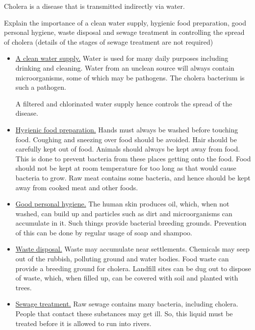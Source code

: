 Cholera is a disease that is transmitted indirectly via water.

\begin{point}
Explain the importance of a clean water supply, hygienic food preparation, good personal hygiene, waste 
disposal and sewage treatment in controlling the spread of cholera (details of the stages of sewage 
treatment are not required)
\end{point}

\begin{itemize}
\item\underline{A clean water supply.} Water is used for many daily purposes including drinking
	and cleaning. Water from an unclean source will always contain microorganisms, some of which
	may be pathogens. The cholera bacterium is such a pathogen. 

	A filtered and chlorinated water supply hence controls the spread of the disease.

\item\underline{Hygienic food preparation.} Hands must always be washed before touching food.
	Coughing and sneezing over food should be avoided. Hair should be carefully kept out of food.
	Animals should always be kept away from food. This is done to prevent bacteria from these places
	getting onto the food. Food should not be kept at room temperature for 
	too long as that would cause bacteria to grow. Raw meat contains some bacteria, and hence should
	be kept away from cooked meat and other foods.

\item\underline{Good personal hygiene.} The human skin produces oil, which, when not washed,
	can build up and particles such as dirt and microorganisms can accumulate in it. Such
	things provide bacterial breeding grounds. Prevention of this can be done by regular usage
	of soap and shampoo.

\item\underline{Waste disposal.} Waste may accumulate near settlements. Chemicals may seep out of
	the rubbish, polluting ground and water bodies. Food waste can provide a breeding ground
	for cholera. Landfill sites can be dug out to dispose of waste, which, when filled up, can
	be covered with soil and planted with trees.

\item\underline{Sewage treatment.} Raw sewage contains many bacteria, including cholera. People
	that contact these substances may get ill. So, this liquid must be treated before it is
	allowed to run into rivers.
\end{itemize}

